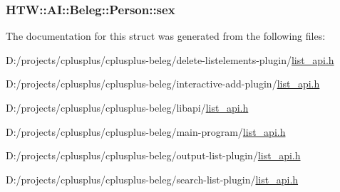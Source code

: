 \hypertarget{struct_h_t_w_1_1_a_i_1_1_beleg_1_1_person_a956a6bbc50e0b907a95f897f0e643845}{
\subsubsection[{sex}]{ H\-T\-W\-::\-A\-I\-::\-Beleg\-::\-Person\-::sex}}\label{struct_h_t_w_1_1_a_i_1_1_beleg_1_1_person_a956a6bbc50e0b907a95f897f0e643845}


The documentation for this struct was generated from the following files\-:\begin{DoxyCompactItemize}
\item 
D\-:/projects/cplusplus/cplusplus-\/beleg/delete-\/listelements-\/plugin/\hyperlink{delete-listelements-plugin_2list__api_8h}{list\-\_\-api.\-h}\item 
D\-:/projects/cplusplus/cplusplus-\/beleg/interactive-\/add-\/plugin/\hyperlink{interactive-add-plugin_2list__api_8h}{list\-\_\-api.\-h}\item 
D\-:/projects/cplusplus/cplusplus-\/beleg/libapi/\hyperlink{libapi_2list__api_8h}{list\-\_\-api.\-h}\item 
D\-:/projects/cplusplus/cplusplus-\/beleg/main-\/program/\hyperlink{main-program_2list__api_8h}{list\-\_\-api.\-h}\item 
D\-:/projects/cplusplus/cplusplus-\/beleg/output-\/list-\/plugin/\hyperlink{output-list-plugin_2list__api_8h}{list\-\_\-api.\-h}\item 
D\-:/projects/cplusplus/cplusplus-\/beleg/search-\/list-\/plugin/\hyperlink{search-list-plugin_2list__api_8h}{list\-\_\-api.\-h}\end{DoxyCompactItemize}

